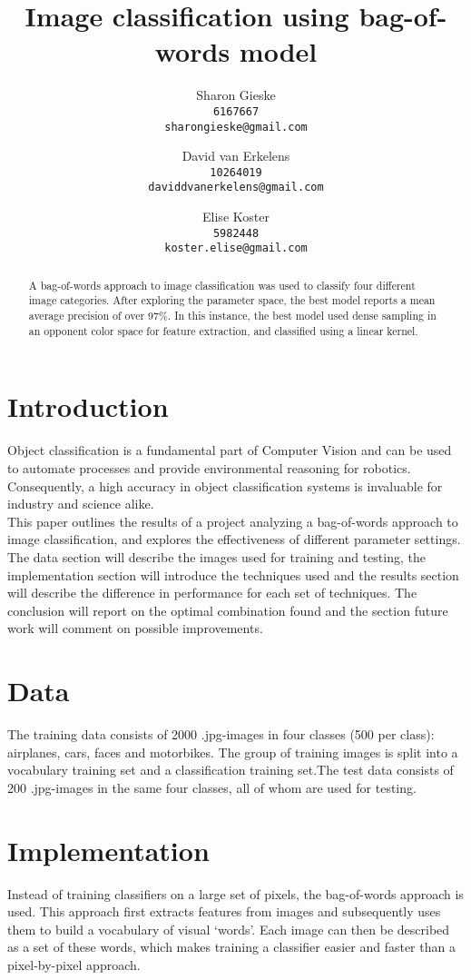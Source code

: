 \documentclass{article} %
\title{Image classification using bag-of-words model}
\author{
Sharon Gieske \\
\texttt{6167667}\\
\texttt{sharongieske@gmail.com} \\
\and
David van Erkelens\\
\texttt{10264019}\\
\texttt{daviddvanerkelens@gmail.com} \\
\and
Elise Koster \\
\texttt{5982448}\\
\texttt{koster.elise@gmail.com}
}
\begin{document}
\maketitle

\begin{abstract}
A bag-of-words approach to image classification was used  to classify four different image categories. After exploring the parameter space, the best model reports a mean average precision of over 97\%. In this instance, the best model used dense sampling in an opponent color space for feature extraction, and classified using a linear kernel.
\end{abstract}


\section{Introduction}
Object classification is a fundamental part of Computer Vision and can be used to automate processes and provide environmental reasoning for robotics. Consequently, a high accuracy in object classification systems is invaluable for industry and science alike.\\
This paper outlines the results of a project analyzing a bag-of-words approach to image classification, and explores the effectiveness of different parameter settings.\\
The data section will describe the images used for training and testing, the implementation section will introduce the techniques used and the results section will describe the difference in performance for each set of techniques. The conclusion will report on the optimal combination found and the section future work will comment on possible improvements.

\section{Data}
The training data consists of 2000 .jpg-images in four classes (500 per class): airplanes, cars, faces and motorbikes. The group of training images is split into a vocabulary training set and a classification training set.The test data consists of 200 .jpg-images in the same four classes, all of whom are used for testing.

\section{Implementation}
Instead of training classifiers on a large set of pixels, the bag-of-words approach is used. This approach first extracts features from images and subsequently uses them to build a vocabulary of visual `words'. Each image can then be described as a set of these words, which makes training a classifier easier and faster than a pixel-by-pixel approach. \\
\end{document}
